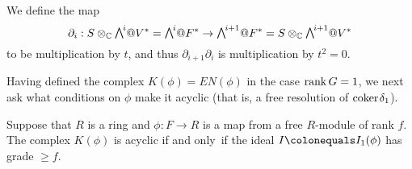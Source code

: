 We define the map
$$
\partial_{i}: S\otimes_{\CC} \mwedge^{i}@V^{*} = \mwedge^{i}@F^{*}  \to
\mwedge^{i+1}@F^{*} = S\otimes_{\CC} \mwedge^{i+1}@V^{*}
$$
to be multiplication by $t$, and thus $\partial_{i+1}\partial_{i}$ is
multiplication by $t^{2} = 0$.

Having defined the complex $K(\phi) = EN(\phi)$ in the case $\operatorname{rank} G =
1$, we next ask what conditions on $\phi$
make it acyclic (that is, a free resolution of ${\rm{coker}\kern1pt} \delta_{1}$).

\begin{theorem}\label{rankG1}
Suppose that $R$ is a ring and $\phi: F\to R$ is a map from a free
$R$-module of rank $f$.
The complex $K(\phi)$ is acyclic if and only~if the ideal $I \colonequals
I_{1}(\phi)$ has grade $\geq f$.
%
\end{theorem}

